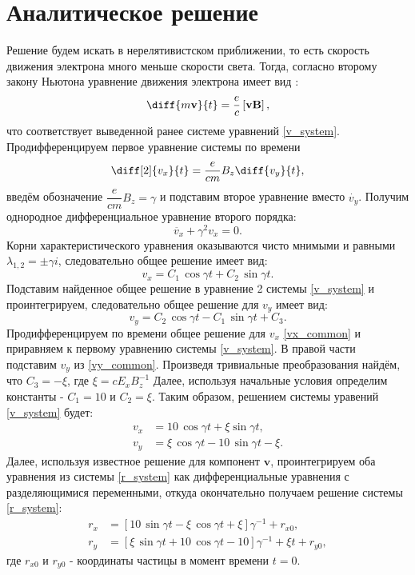 \documentclass[a4paper]{article}
\begin{document}
\section{Аналитическое решение}
Решение будем искать в нерелятивистском приближении, то есть скорость движения электрона много меньше скорости света. Тогда, согласно второму закону Ньютона уравнение движения электрона имеет вид \cite{Izmaylov} :
\begin{equation}
\diff{m \mathbf{v}}{t} = \dfrac{e}{c} \left[ \mathbf{vB} \right] ,
\end{equation}
что соответствует выведенной ранее системе уравнений \eqref{v_system}. Продифференцируем первое уравнение системы по времени
\[
\diff[2]{v_x}{t} =\frac{e}{cm} B_z \diff{v_y}{t},
\]
введём обозначение $\dfrac{e}{cm}B_z = \gamma$ и подставим второе уравнение вместо $\dot{v_y}$. Получим однородное дифференциальное уравнение второго порядка:
\[
\ddot{v_x} + \gamma^2 v_x = 0 .		
\]
Корни характеристического уравнения оказываются чисто мнимыми и равными ${\lambda_{1,2} = \pm \gamma i}$, следовательно общее решение имеет вид:
\begin{equation}\label{vx_common}
v_x = C_1\, \cos{\gamma t} + C_2\, \sin{\gamma t} .
\end{equation}
Подставим найденное общее решение в уравнение 2 системы \eqref{v_system} и проинтегрируем, следовательно общее решение для $v_y$ имеет вид:
\begin{equation}\label{vy_common}
v_y = C_2 \, \cos{\gamma t} - C_1 \, \sin {\gamma t} + C_3 .
\end{equation}
Продифференцируем по времени общее решение для $v_x$ \eqref{vx_common} и приравняем к первому уравнению системы \eqref{v_system}. В правой части подставим $v_y$ из \eqref{vy_common}. Произведя тривиальные преобразования найдём, что $C_3 = -\xi$, где $\xi = cE_xB_z^{-1}$ Далее, используя начальные условия определим константы - $C_1 = 10$ и $C_2 = \xi$. Таким образом, решением системы уравений \eqref{v_system} будет:
\begin{align}\label{analytic_v}
v_x &= 10 \, \cos{\gamma t} + \xi \sin{\gamma t} , \\
v_y &= \xi \, \cos{\gamma t} - 10 \, \sin {\gamma t} - \xi .
\end{align}
Далее, используя известное решение для компонент $\mathbf{v}$, проинтегрируем оба уравнения из системы \eqref{r_system} как дифференциальные уравнения с разделяющимися переменными, откуда окончательно получаем решение системы \eqref{r_system}:
\begin{align}\label{analytic_r}
r_x &= \left[10 \, \sin{\gamma t} - \xi \, \cos{\gamma t} + \xi\right] \gamma^{-1} + r_{x0} ,\\
r_y &= \left[\xi \, \sin{\gamma t} + 10 \, \cos{\gamma t} - 10\right] \gamma^{-1} + \xi t  + r_{y0} , 
\end{align} 
где $r_{x0}$ и $r_{y0}$ - координаты частицы в момент времени $t=0$.
\end{document}
